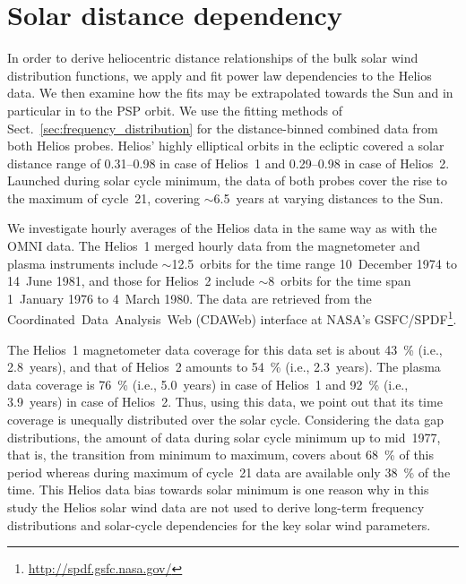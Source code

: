 \documentclass[]{aa}
\begin{document}
        \section{Solar distance dependency}
        \label{sec:solar_distance_dependency}
        In order to derive heliocentric distance relationships of the bulk solar wind distribution functions, we apply and fit power law dependencies to the Helios data. We then examine how the fits may be extrapolated towards the Sun and in particular in to the PSP orbit. We use the fitting methods of Sect.~\ref{sec:frequency_distribution} for the distance-binned combined data from both Helios probes. Helios’ highly elliptical orbits in the ecliptic covered a solar distance range of \SIrange{0.31}{0.98}{\au} in case of Helios~1 and \SIrange{0.29}{0.98}{\au} in case of Helios~2. Launched during solar cycle minimum, the data of both probes cover the rise to the maximum of cycle~21, covering $\sim$6.5~years at varying distances to the Sun.

        We investigate hourly averages of the Helios data in the same way as with the OMNI data. The Helios~1 merged hourly data from the magnetometer and plasma instruments \citep{Rosenbauer1977} include $\sim$12.5~orbits for the time range 10~December 1974 to 14~June 1981, and those for Helios~2 include $\sim$8~orbits for the time span 1~January 1976 to 4~March 1980. The data are retrieved from the Coordinated~Data~Analysis~Web (CDAWeb) interface at NASA's GSFC/SPDF\footnote{\url{http://spdf.gsfc.nasa.gov/}}.

        The Helios~1 magnetometer data coverage for this data set is about \SI{43}{\%} (i.e., 2.8~years), and that of Helios~2 amounts to \SI{54}{\%} (i.e., 2.3~years). The plasma data coverage is \SI{76}{\%} (i.e., 5.0~years) in case of Helios~1 and \SI{92}{\%} (i.e., 3.9~years) in case of Helios~2. 
        Thus, using this data, we point out that its time coverage is unequally distributed over the solar cycle. Considering the data gap distributions, the amount of data during solar cycle minimum up to mid~1977, that is, the transition from minimum to maximum, covers about \SI{68}{\percent} of this period whereas during maximum of cycle~21 data are available only \SI{38}{\percent} of the time. This Helios data bias towards solar minimum is one reason why in this study the Helios solar wind data are not used to derive long-term frequency distributions and solar-cycle dependencies for the key solar wind parameters.
\end{document}

